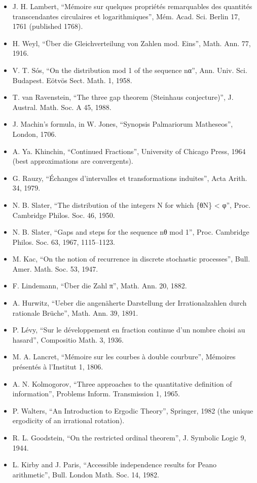 \begin{itemize}
\item J. H. Lambert, “Mémoire sur quelques propriétés remarquables des quantités transcendantes circulaires et logarithmiques”, Mém. Acad. Sci. Berlin 17, 1761 (published 1768).
\item H. Weyl, “Über die Gleichverteilung von Zahlen mod. Eins”, Math. Ann. 77, 1916.
\item V. T. Sós, “On the distribution mod 1 of the sequence nα”, Ann. Univ. Sci. Budapest. Eötvös Sect. Math. 1, 1958.
\item T. van Ravenstein, “The three gap theorem (Steinhaus conjecture)”, J. Austral. Math. Soc. A 45, 1988.
\item J. Machin's formula, in W. Jones, “Synopsis Palmariorum Matheseos”, London, 1706.
\item A. Ya. Khinchin, “Continued Fractions”, University of Chicago Press, 1964 (best approximations are convergents).
\item G. Rauzy, “Échanges d'intervalles et transformations induites”, Acta Arith. 34, 1979.
\item N. B. Slater, “The distribution of the integers N for which \{θN\} < φ”, Proc. Cambridge Philos. Soc. 46, 1950.
\item N. B. Slater, “Gaps and steps for the sequence nθ mod 1”, Proc. Cambridge Philos. Soc. 63, 1967, 1115–1123.
\item M. Kac, “On the notion of recurrence in discrete stochastic processes”, Bull. Amer. Math. Soc. 53, 1947.
\item F. Lindemann, “Über die Zahl π”, Math. Ann. 20, 1882.
\item A. Hurwitz, “Ueber die angenäherte Darstellung der Irrationalzahlen durch rationale Brüche”, Math. Ann. 39, 1891.
\item P. Lévy, “Sur le développement en fraction continue d'un nombre choisi au hasard”, Compositio Math. 3, 1936.
\item M. A. Lancret, “Mémoire sur les courbes à double courbure”, Mémoires présentés à l'Institut 1, 1806.
\item A. N. Kolmogorov, “Three approaches to the quantitative definition of information”, Problems Inform. Transmission 1, 1965.
\item P. Walters, “An Introduction to Ergodic Theory”, Springer, 1982 (the unique ergodicity of an irrational rotation).
\item R. L. Goodstein, “On the restricted ordinal theorem”, J. Symbolic Logic 9, 1944.
\item L. Kirby and J. Paris, “Accessible independence results for Peano arithmetic”, Bull. London Math. Soc. 14, 1982.

\end{itemize}
